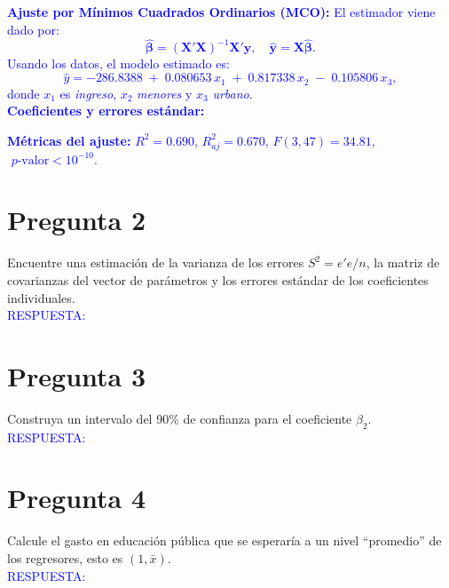 \documentclass[10pt]{article}
\begin{document}
    \textcolor{blue}{
        \textbf{Ajuste por Mínimos Cuadrados Ordinarios (MCO):} El estimador viene dado por:
        \[
        \hat{\boldsymbol{\beta}}=(\mathbf{X}'\mathbf{X})^{-1}\mathbf{X}'\mathbf{y},\quad \hat{\mathbf{y}}=\mathbf{X}\hat{\boldsymbol{\beta}}.
        \]
        Usando los datos, el modelo estimado es:
        \[
        \widehat{y}= -286.8388\; +\; 0.080653\, x_1\; +\; 0.817338\, x_2\; -\; 0.105806\, x_3,
        \]
        \noindent donde $x_1$ es \emph{ingreso}, $x_2$ \emph{menores} y $x_3$ \emph{urbano}. \\
        \noindent \textbf{Coeficientes y errores estándar:}
        
        \noindent \textbf{Métricas del ajuste:} $R^2=0.690$, $R^2_{aj}=0.670$, $F(3,47)=34.81$, $\,\,p\text{-valor}<10^{-10}$.\\
        
    }
\section{Pregunta 2}
Encuentre una estimación de la varianza de los errores $S^2 = e'e/n$, la matriz de covarianzas del vector de parámetros y los errores estándar de los coeficientes individuales. \\

\textcolor{blue}{RESPUESTA: }
\section{Pregunta 3}
Construya un intervalo del 90\% de confianza para el coeficiente $\beta_2$. \\

\textcolor{blue}{RESPUESTA: }
\section{Pregunta 4}
Calcule el gasto en educación pública que se esperaría a un nivel “promedio” de los regresores, esto es $(1,\bar{x})$. \\

\textcolor{blue}{RESPUESTA: }
\end{document}
